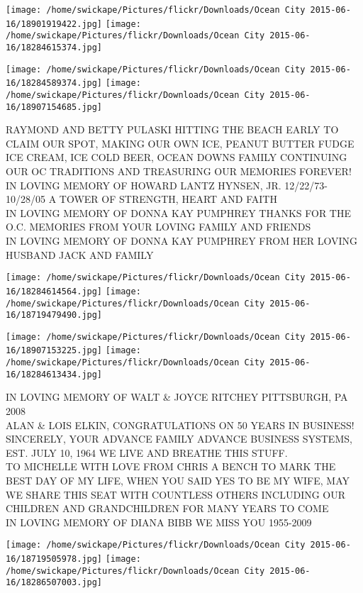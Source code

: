 \documentclass[10pt,letterpaper]{article}
\begin{document}
\texttt{[image: /home/swickape/Pictures/flickr/Downloads/Ocean City 2015-06-16/18901919422.jpg]}
\texttt{[image: /home/swickape/Pictures/flickr/Downloads/Ocean City 2015-06-16/18284615374.jpg]}

\texttt{[image: /home/swickape/Pictures/flickr/Downloads/Ocean City 2015-06-16/18284589374.jpg]}
\texttt{[image: /home/swickape/Pictures/flickr/Downloads/Ocean City 2015-06-16/18907154685.jpg]}

RAYMOND AND BETTY PULASKI HITTING THE BEACH EARLY TO CLAIM OUR SPOT, MAKING OUR OWN ICE, PEANUT BUTTER FUDGE ICE CREAM, ICE COLD BEER, OCEAN  DOWNS FAMILY CONTINUING OUR OC TRADITIONS AND TREASURING OUR MEMORIES FOREVER!\\
IN LOVING MEMORY OF HOWARD LANTZ HYNSEN, JR.  12/22/73{-}10/28/05 A TOWER OF STRENGTH, HEART AND FAITH\\
IN LOVING MEMORY OF DONNA KAY PUMPHREY THANKS FOR THE O.C. MEMORIES FROM YOUR LOVING FAMILY AND FRIENDS\\
IN LOVING MEMORY OF DONNA KAY PUMPHREY FROM HER LOVING HUSBAND JACK AND FAMILY
\pagebreak

\texttt{[image: /home/swickape/Pictures/flickr/Downloads/Ocean City 2015-06-16/18284614564.jpg]}
\texttt{[image: /home/swickape/Pictures/flickr/Downloads/Ocean City 2015-06-16/18719479490.jpg]}

\texttt{[image: /home/swickape/Pictures/flickr/Downloads/Ocean City 2015-06-16/18907153225.jpg]}
\texttt{[image: /home/swickape/Pictures/flickr/Downloads/Ocean City 2015-06-16/18284613434.jpg]}

IN LOVING MEMORY OF WALT \& JOYCE RITCHEY PITTSBURGH, PA 2008\\
ALAN \& LOIS ELKIN, CONGRATULATIONS ON 50 YEARS IN BUSINESS!  SINCERELY, YOUR ADVANCE FAMILY ADVANCE BUSINESS SYSTEMS, EST. JULY 10, 1964 WE LIVE AND BREATHE THIS STUFF.\\
TO MICHELLE WITH LOVE FROM CHRIS A BENCH TO MARK THE BEST DAY OF MY LIFE, WHEN YOU SAID YES TO BE MY WIFE, MAY WE SHARE THIS SEAT WITH COUNTLESS OTHERS INCLUDING OUR CHILDREN AND GRANDCHILDREN FOR MANY YEARS TO COME\\
IN LOVING MEMORY OF DIANA BIBB WE MISS YOU 1955{-}2009
\pagebreak

\texttt{[image: /home/swickape/Pictures/flickr/Downloads/Ocean City 2015-06-16/18719505978.jpg]}
\texttt{[image: /home/swickape/Pictures/flickr/Downloads/Ocean City 2015-06-16/18286507003.jpg]}
\end{document}
